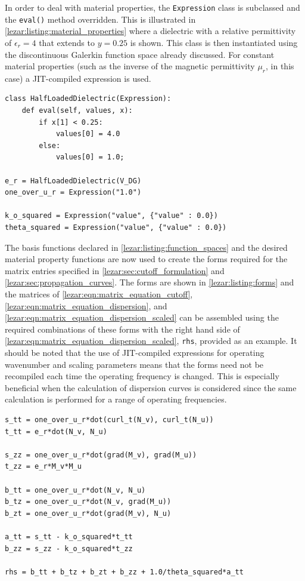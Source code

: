 In order to deal with material properties, the {\tt Expression} class is
subclassed and the {\tt eval()} method overridden. This is illustrated
in \lstlistingname{} \ref{lezar:listing:material_properties} where a
dielectric with a relative permittivity of $\epsilon_r = 4$ that extends to
$y = 0.25$ is shown. This class is then instantiated using the
discontinuous Galerkin function space already discussed. For constant
material properties (such as the inverse of the magnetic permittivity
$\mu_r$, in this case) a JIT-compiled expression is used.

\begin{lstlisting}[float=ht, caption=Material properties and expressions., label=lezar:listing:material_properties]
class HalfLoadedDielectric(Expression):
    def eval(self, values, x):
        if x[1] < 0.25:
            values[0] = 4.0
        else:
            values[0] = 1.0;

e_r = HalfLoadedDielectric(V_DG)
one_over_u_r = Expression("1.0")

k_o_squared = Expression("value", {"value" : 0.0})
theta_squared = Expression("value", {"value" : 0.0})
\end{lstlisting}

The basis functions declared in \lstlistingname{}
 \ref{lezar:listing:function_spaces} and the desired material property
 functions are now used to create the forms required for the matrix
 entries specified in \ref{lezar:sec:cutoff_formulation} and
 \ref{lezar:sec:propagation_curves}. The forms are shown in
 \lstlistingname{} \ref{lezar:listing:forms} and the matrices of
 \eqref{lezar:eqn:matrix_equation_cutoff},
 \eqref{lezar:eqn:matrix_equation_dispersion}, and
 \eqref{lezar:eqn:matrix_equation_dispersion_scaled} can be assembled using
 the required combinations of these forms with the right hand side of
 \eqref{lezar:eqn:matrix_equation_dispersion_scaled}, {\tt rhs}, provided as
 an example.  It should be noted that the use of JIT-compiled expressions for
 operating wavenumber and scaling parameters means that the forms need
 not be recompiled each time the operating frequency is changed. This
 is especially beneficial when the calculation of dispersion curves is
 considered since the same calculation is performed for a range of
 operating frequencies.

\begin{lstlisting}[float=hb, caption=Forms for matrix entries., label=lezar:listing:forms]
s_tt = one_over_u_r*dot(curl_t(N_v), curl_t(N_u))
t_tt = e_r*dot(N_v, N_u)

s_zz = one_over_u_r*dot(grad(M_v), grad(M_u))
t_zz = e_r*M_v*M_u

b_tt = one_over_u_r*dot(N_v, N_u)
b_tz = one_over_u_r*dot(N_v, grad(M_u))
b_zt = one_over_u_r*dot(grad(M_v), N_u)

a_tt = s_tt - k_o_squared*t_tt
b_zz = s_zz - k_o_squared*t_zz

rhs = b_tt + b_tz + b_zt + b_zz + 1.0/theta_squared*a_tt
\end{lstlisting}

